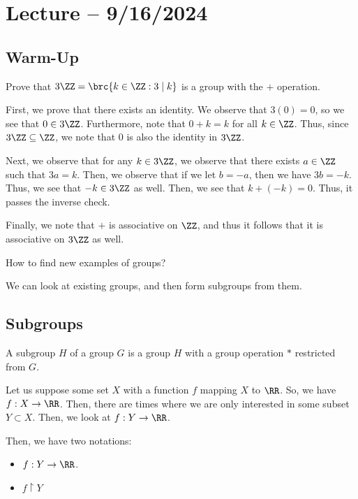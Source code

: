 \documentclass[openany]{book}
\begin{document}
\section{Lecture -- 9/16/2024}
\subsection{Warm-Up}
\begin{hw}
	Prove that $3\ZZ = \brc{k \in \ZZ : 3 \mid k}$ is a group with the $+$ operation.
\end{hw}
\begin{solution}
	First, we prove that there exists an identity. We observe that $3(0) = 0$, so we see that $0 \in 3\ZZ$. Furthermore, note that $0 + k = k$ for all $k \in \ZZ$. Thus, since $3\ZZ \subseteq \ZZ$, we note that $0$ is also the identity in $3\ZZ$.
	
	Next, we observe that for any $k \in 3\ZZ$, we observe that there exists $a \in \ZZ$ such that $3a = k$. Then, we observe that if we let $b = -a$, then we have $3b = -k$. Thus, we see that $-k \in 3\ZZ$ as well. Then, we see that $k + (-k) = 0$. Thus, it passes the inverse check.
	
	Finally, we note that $+$ is associative on $\ZZ$, and thus it follows that it is associative on $3\ZZ$ as well.
\end{solution}

\begin{hw}
	How to find new examples of groups?
\end{hw}
\begin{solution}
	We can look at existing groups, and then form subgroups from them.
\end{solution}

\subsection{Subgroups}
\begin{defn}
	A subgroup $H$ of a group $G$ is a group $H$ with a group operation $*$ restricted from $G$.
\end{defn}

\begin{example}[Restriction]
	Let us suppose some set $X$ with a function $f$ mapping $X$ to $\RR$. So, we have $f : X \rightarrow \RR$. Then, there are times where we are only interested in some subset $Y \subset X$. Then, we look at $f : Y \rightarrow \RR$.
	
	Then, we have two notations:
	\begin{itemize}
		\item $f : Y \rightarrow \RR$.
		\item $f \restriction Y$
	\end{itemize}
\end{example}
\end{document}
